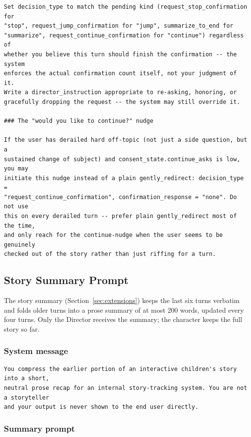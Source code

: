 \begin{lstlisting}
Set decision_type to match the pending kind (request_stop_confirmation for
"stop", request_jump_confirmation for "jump", summarize_to_end for
"summarize", request_continue_confirmation for "continue") regardless of
whether you believe this turn should finish the confirmation -- the system
enforces the actual confirmation count itself, not your judgment of it.
Write a director_instruction appropriate to re-asking, honoring, or
gracefully dropping the request -- the system may still override it.

### The "would you like to continue?" nudge

If the user has derailed hard off-topic (not just a side question, but a
sustained change of subject) and consent_state.continue_asks is low, you may
initiate this nudge instead of a plain gently_redirect: decision_type =
"request_continue_confirmation", confirmation_response = "none". Do not use
this on every derailed turn -- prefer plain gently_redirect most of the time,
and only reach for the continue-nudge when the user seems to be genuinely
checked out of the story rather than just riffing for a turn.
\end{lstlisting}

\subsection{Story Summary Prompt}
\label{app:story-summary}

The story summary (Section~\ref{sec:extensions}) keeps the last six turns
verbatim and folds older turns into a prose summary of at most 200 words,
updated every four turns. Only the Director receives the summary; the
character keeps the full story so far.

\subsubsection{System message}

\begin{lstlisting}
You compress the earlier portion of an interactive children's story into a short,
neutral prose recap for an internal story-tracking system. You are not a storyteller
and your output is never shown to the end user directly.
\end{lstlisting}

\subsubsection{Summary prompt}

